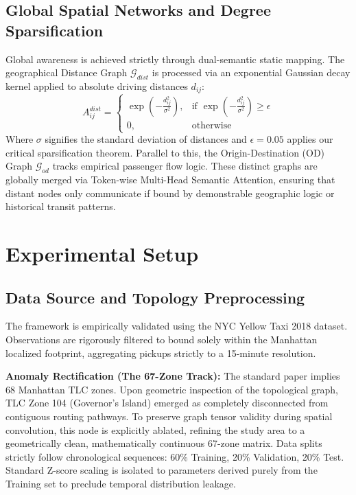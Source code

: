 \documentclass{rapportECL}
\begin{document}
\subsection{Global Spatial Networks and Degree Sparsification}
Global awareness is achieved strictly through dual-semantic static mapping. The geographical Distance Graph $\mathcal{G}_{dist}$ is processed via an exponential Gaussian decay kernel applied to absolute driving distances $d_{ij}$:
\begin{equation}
A_{ij}^{dist} = 
\begin{cases}
\exp\left(-\frac{d_{ij}^2}{\sigma^2}\right), & \text{if } \exp\left(-\frac{d_{ij}^2}{\sigma^2}\right) \geq \epsilon \\
0, & \text{otherwise}
\end{cases}
\end{equation}
Where $\sigma$ signifies the standard deviation of distances and $\epsilon=0.05$ applies our critical sparsification theorem. Parallel to this, the Origin-Destination (OD) Graph $\mathcal{G}_{od}$ tracks empirical passenger flow logic. These distinct graphs are globally merged via Token-wise Multi-Head Semantic Attention, ensuring that distant nodes only communicate if bound by demonstrable geographic logic or historical transit patterns.

\section{Experimental Setup}

\subsection{Data Source and Topology Preprocessing}
The framework is empirically validated using the NYC Yellow Taxi 2018 dataset. Observations are rigorously filtered to bound solely within the Manhattan localized footprint, aggregating pickups strictly to a 15-minute resolution. 

\textbf{Anomaly Rectification (The 67-Zone Track):} The standard paper implies 68 Manhattan TLC zones. Upon geometric inspection of the topological graph, TLC Zone 104 (Governor's Island) emerged as completely disconnected from contiguous routing pathways. To preserve graph tensor validity during spatial convolution, this node is explicitly ablated, refining the study area to a geometrically clean, mathematically continuous 67-zone matrix. Data splits strictly follow chronological sequences: 60\% Training, 20\% Validation, 20\% Test. Standard Z-score scaling is isolated to parameters derived purely from the Training set to preclude temporal distribution leakage.
\end{document}
